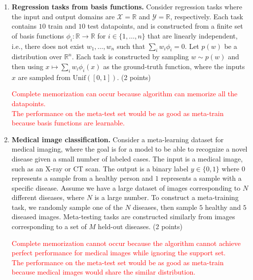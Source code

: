 \documentclass[12pt]{article}
\begin{document}
    \begin{enumerate}[label=(\alph*)]
        \item \textbf{Regression tasks from basis functions.}
        Consider regression tasks where the input and output domains are $\mathcal{X} = \mathbb{R}$ and $\mathcal{Y} = \mathbb{R}$, respectively.
        Each task contains $10$ train and $10$ test datapoints, and is constructed from a finite set of basis functions $\phi_i: \mathbb{R} \rightarrow \mathbb{R}$ for $i \in \{1, \ldots, n\}$ that are linearly independent, i.e., there does not exist $w_1, \ldots, w_n$ such that $\sum_i w_i \phi_i = 0$.
        Let $p(w)$ be a distribution over $\mathbb{R}^n$.
        Each task is constructed by sampling $w \sim p(w)$ and then using $x \mapsto \sum_i w_i \phi_i(x)$ as the ground-truth function, where the inputs $x$ are sampled from $\textrm{Unif}([0, 1])$.
        (2 points)

        \textcolor{red}{Complete memorization can occur because algorithm can memorize all the datapoints.\\
        The performance on the meta-test set would be as good as meta-train because basis functions are learnable.}

        \item \textbf{Medical image classification.}
        Consider a meta-learning dataset for medical imaging, where the goal is for a model to be able to recognize a novel disease given a small number of labeled cases.
        The input is a medical image, such as an X-ray or CT scan.
        The output is a binary label $y \in \{0, 1\}$ where $0$ represents a sample from a healthy person and $1$ represents a sample with a specific disease.
        Assume we have a large dataset of images corresponding to $N$ different diseases, where $N$ is a large number.
        To construct a meta-training task, we randomly sample one of the $N$ diseases, then sample $5$ healthy and $5$ diseased images.
        Meta-testing tasks are constructed similarly from images corresponding to a set of $M$ held-out diseases.
        (2 points)

        \textcolor{red}{Complete memorization cannot occur because the algorithm cannot achieve perfect performance for medical images while ignoring the support set.\\
        The performance on the meta-test set would be as good as meta-train because medical images would share the similar distribution.}


\end{enumerate}
\end{document}
